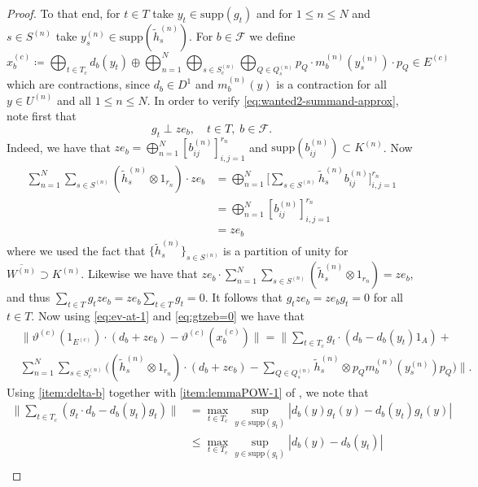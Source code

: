 \documentclass[11pt,a4paper]{amsart}
\theoremstyle{definition}
\numberwithin{equation}{section}
\newcommand{\mc}[1]{\mathcal{#1}}
\def\supp{\mathrm{supp}}
\begin{document}
\begin{proof}
To that end, for $t\in T$ take $y_t\in \supp(g_t)$ and for $1\le n\le N$ and $s\in S^{(n)}$ take $y_s^{(n)}\in \supp(\tilde{h}_s^{(n)})$. For $b\in\mc{F}$ we define
\begin{equation}\label{eq:xbc}
x_b^{(c)}\coloneqq \bigoplus_{t\in T_c}d_b(y_t)\oplus\bigoplus_{n=1}^N\bigoplus_{s\in S_c^{(n)}}\bigoplus_{Q\in Q_s^{(n)}}p_Q\cdot m_b^{(n)}(y_s^{(n)})\cdot p_Q\in E^{(c)}
\end{equation}
which are contractions, since $d_b\in D^1$ and $m_b^{(n)}(y)$ is a contraction for all $y\in U^{(n)}$ and all $1\le n\le N$. In order to verify \eqref{eq:wanted2-summand-approx}, note first that
\begin{equation}\label{eq:gtzeb=0}
g_t\perp ze_b,\quad t\in T,\; b\in\mc{F}.
\end{equation}
Indeed, we have that $ze_b=\bigoplus_{n=1}^N[b_{ij}^{(n)}]_{i,j=1}^{r_n}$ and $\supp(b_{ij}^{(n)})\subset K^{(n)}$. Now 
\begin{align*}
\sum_{n=1}^N\sum_{s\in S^{(n)}}(\tilde{h}_s^{(n)}\otimes 1_{r_n})\cdot ze_b &= \bigoplus_{n=1}^N\bigg[\sum_{s\in S^{(n)}}\tilde{h}_s^{(n)}b_{ij}^{(n)}\bigg]_{i,j=1}^{r_n}\\
&=\bigoplus_{n=1}^N[b_{ij}^{(n)}]_{i,j=1}^{r_n}\\
&=ze_b
\end{align*}
where we used the fact that $\{\tilde{h}_s^{(n)}\}_{s\in S^{(n)}}$ is a partition of unity for $\overline{W^{(n)}}\supset K^{(n)}$. Likewise we have that $ze_b\cdot \sum_{n=1}^N\sum_{s\in S^{(n)}}(\tilde{h}_s^{(n)}\otimes 1_{r_n})=ze_b$, and thus $\sum_{t\in T}g_tze_b=ze_b\sum_{t\in T}g_t=0$. It follows that $g_tze_b=ze_bg_t=0$ for all $t\in T$. Now using \eqref{eq:ev-at-1} and \eqref{eq:gtzeb=0} we have that
\begin{align}\label{eq:step1}
&\|\vartheta^{(c)}(1_{E^{(c)}})\cdot (d_b+ze_b)-\vartheta^{(c)}(x_b^{(c)})\|= \bigg\|\sum_{t\in T_c}g_t\cdot (d_b-d_b(y_t)1_A)+\\
&\sum_{n=1}^N\sum_{s\in S_c^{(n)}}\bigg((\tilde{h}_s^{(n)}\otimes 1_{r_n})\cdot (d_b+ze_b) - \sum_{Q\in Q_s^{(n)}}\tilde{h}_s^{(n)}\otimes p_Qm_b^{(n)}(y_s^{(n)})p_Q\bigg)\bigg\|.\nonumber
\end{align}
Using \ref{item:delta-b} together with \ref{item:lemmaPOW-1} of , we note that
\begin{align}\label{eq:step2}
\bigg\|\sum_{t\in T_c}(g_t\cdot d_b-d_b(y_t)g_t)\bigg\|&=\max_{t\in T_c}\sup_{y\in \supp(g_t)}|d_b(y)g_t(y)-d_b(y_t)g_t(y)|\\
&\le\max_{t\in T_c}\sup_{y\in \supp(g_t)}|d_b(y)-d_b(y_t)|\nonumber\\

\end{align}
\end{proof}
\end{document}
